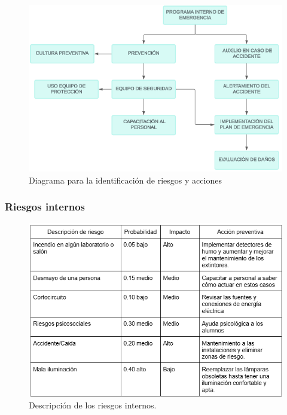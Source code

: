     \begin{figure}[H]
        \centering
        \includegraphics[scale=0.4]{35/Img/diagramaPE.png}
        \caption{Diagrama para la identificación de riesgos y acciones}
    \end{figure}
    
    \subsubsection{Riesgos internos}
    
    \begin{figure}[H]
        \centering
        \includegraphics[scale=0.5]{35/Img/riesgosInternos.png}
        \caption{Descripción de los riesgos internos.}
    \end{figure}
    
